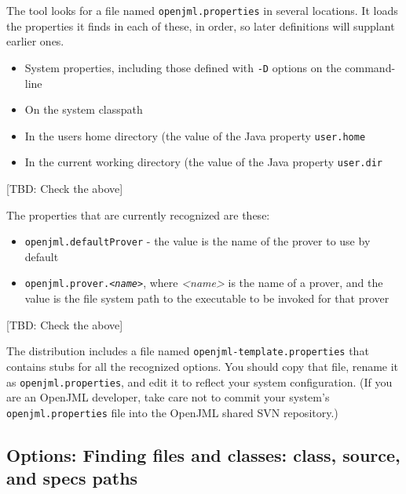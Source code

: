 \documentclass{report}%
\newcommand{\nospace}{\setlength{\itemsep}{0in}\setlength{\parsep}{0in}\setlength{\parskip}{0in}\setlength{\topsep}{0in}}
\begin{document}
The tool looks for a file named {\tt openjml.properties} in several locations. It loads the
properties it finds in each of these, in order, so later definitions will supplant earlier ones.
\begin{itemize}\nospace
\item System properties, including those defined with {\tt -D} options on the command-line
\item On the system classpath
\item In the users home directory (the value of the Java property {\tt user.home}
\item In the current working directory (the value of the Java property {\tt user.dir}
\end{itemize}
[TBD: Check the above]

The properties that are currently recognized are these:
\begin{itemize}\nospace
\item {\tt openjml.defaultProver} - the value is the name of the prover to use by default
\item {\tt openjml.prover.{\it <name>}}, where {\it <name>} is the name of a prover, and
the value is the file system path to the executable to be invoked for that prover
\end{itemize}
[TBD: Check the above]

The distribution includes a file named {\tt openjml-template.properties} that contains stubs for all the recognized options.
You should copy that file, rename it as {\tt openjml.properties}, and edit it to reflect your system configuration.
(If you are an OpenJML developer, take care not to commit your system's {\tt openjml.properties} file into the OpenJML shared SVN repository.)

\subsection{Options: Finding files and classes: class, source, and specs paths}
\label{OptionsPaths}
\end{document}
